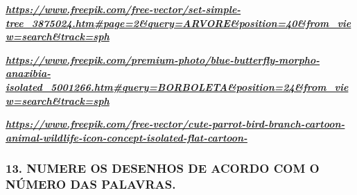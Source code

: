 \href{https://www.freepik.com/free-vector/set-simple-tree_3875024.htm\#page=2\&query=ARVORE\&position=40\&from_view=search\&track=sph}{\textbf{\emph{https://www.freepik.com/free-vector/set-simple-tree\_3875024.htm\#page=2\&query=ARVORE\&position=40\&from\_view=search\&track=sph}}}

\href{https://www.freepik.com/premium-photo/blue-butterfly-morpho-anaxibia-isolated_5001266.htm\#query=BORBOLETA\&position=24\&from_view=search\&track=sph}{\textbf{\emph{https://www.freepik.com/premium-photo/blue-butterfly-morpho-anaxibia-isolated\_5001266.htm\#query=BORBOLETA\&position=24\&from\_view=search\&track=sph}}}

\href{https://www.freepik.com/free-vector/cute-parrot-bird-branch-cartoon-animal-wildlife-icon-concept-isolated-flat-cartoon-}{\textbf{\emph{https://www.freepik.com/free-vector/cute-parrot-bird-branch-cartoon-animal-wildlife-icon-concept-isolated-flat-cartoon-}}}\protect\hypertarget{_heading=h.hanzzj3wwcdx}{}{\protect\hypertarget{_heading=h.bw5gy3j8k2c7}{}{}}

\subsubsection{13. NUMERE OS DESENHOS DE ACORDO COM O NÚMERO DAS
PALAVRAS.}\label{numere-os-desenhos-de-acordo-com-o-nuxfamero-das-palavras.}

